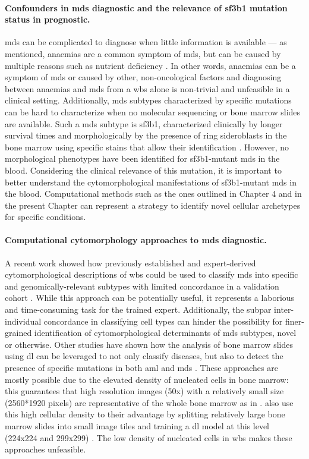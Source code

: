 \paragraph{Confounders in \ac{mds} diagnostic and the relevance of \ac{sf3b1} mutation status in prognostic.} \Ac{mds} can be complicated to diagnose when little information is available --- as mentioned, anaemias are a common symptom of \ac{mds}, but can be caused by multiple reasons such as nutrient deficiency \cite{Castle1978-ky,Short2013-pz,Aslinia2006-en}. In other words, anaemias can be a symptom of \ac{mds} or caused by other, non-oncological factors and diagnosing between anaemias and \ac{mds} from a \ac{wbs} alone is non-trivial and unfeasible in a clinical setting. Additionally, \ac{mds} subtypes characterized by specific mutations can be hard to characterize when no molecular sequencing or bone marrow slides are available. Such a \ac{mds} subtype is \ac{sf3b1}, characterized clinically by longer survival times \cite{Malcovati2020-no} and morphologically by the presence of ring sideroblasts in the bone marrow using specific stains that allow their identification \cite{Hellstrom_Lindberg2015-zs}. However, no morphological phenotypes have been identified for \ac{sf3b1}-mutant \ac{mds} in the blood. Considering the clinical relevance of this mutation, it is important to better understand the cytomorphological manifestations of \ac{sf3b1}-mutant \ac{mds} in the blood. Computational methods such as the ones outlined in Chapter 4 and in the present Chapter can represent a strategy to identify novel cellular archetypes for specific conditions.

\paragraph{Computational cytomorphology approaches to \ac{mds} diagnostic.} A recent work showed how previously established and expert-derived cytomorphological descriptions of \ac{wbs} could be used to classify \ac{mds} into specific and genomically-relevant subtypes with limited concordance in a validation cohort \cite{Nagata2020-lh}. While this approach can be potentially useful, it represents a laborious and time-consuming task for the trained expert. Additionally, the subpar inter-individual concordance in classifying cell types can hinder the possibility for finer-grained identification of cytomorphological determinants of \ac{mds} subtypes, novel or otherwise. Other studies have shown how the analysis of bone marrow slides using \ac{dl} can be leveraged to not only classify diseases, but also to detect the presence of specific mutations in both \ac{aml} and \ac{mds} \cite{Bruck2021-fx,Eckardt2021-fb}. These approaches are mostly possible due to the elevated density of nucleated cells in bone marrow: this guarantees that high resolution images (50x) with a relatively small size (2560*1920 pixels) are representative of the whole bone marrow as in \cite{Eckardt2021-fb}.   also use this high cellular density to their advantage by splitting relatively large bone marrow slides into small image tiles and training a \ac{dl} model at this level (224x224 and 299x299) \cite{Bruck2021-fx}. The low density of nucleated cells in \ac{wbs} makes these approaches unfeasible.

